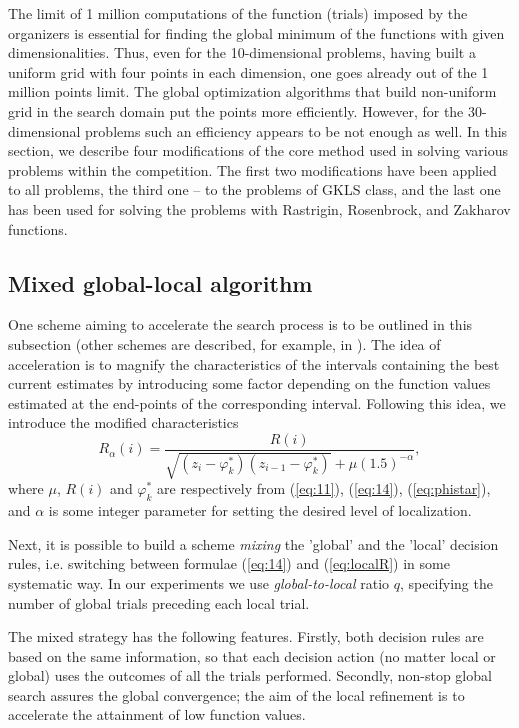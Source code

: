 \documentclass{llncs}
\begin{document}
The limit of 1 million computations of the function (trials) imposed by the organizers is essential for finding the global minimum of the functions with given dimensionalities. Thus, even for the 10-dimensional problems, having built a uniform grid with four points in each dimension, one goes already out of the 1 million points limit. %
The global optimization algorithms that build non-uniform grid in the search domain put the points more efficiently. %
However, for the 30-dimensional problems such an efficiency appears to be not enough as well. In this section, we describe four modifications of the core method used in solving various problems within the competition. The first two modifications have been applied to all problems, the third one – to the problems of GKLS class, and the last one has been used for solving the problems with Rastrigin, Rosenbrock, and Zakharov functions.

\subsection{Mixed global-local algorithm}\label{mixed}

One scheme aiming to accelerate the search process is to be outlined in this subsection (other schemes are described, for example, in \cite{Kvasov2006,Kvasov2015} ). The idea of acceleration is to magnify the characteristics of the intervals containing the best current estimates by introducing some factor depending on the function values estimated at the end-points of the corresponding interval. Following this idea, we introduce the modified characteristics 
\begin{equation}\label{eq:localR}
  R_\alpha(i) = \frac{R(i)}{\sqrt{(z_i-\varphi_k^\ast)(z_{i-1}-\varphi_k^\ast)}+\mu (1.5)^{-\alpha}},
\end{equation}
where $\mu$, $R(i)$ and $\varphi_k^\ast$ are respectively from (\ref{eq:11}), (\ref{eq:14}), (\ref{eq:phistar}), and $\alpha$ is some integer parameter for setting the desired level of localization. 

Next, it is possible to build a scheme \textit{mixing} the 'global' and the 'local' decision rules, i.e. switching between formulae (\ref{eq:14}) and (\ref{eq:localR}) in some systematic way. In our experiments we use \textit{global-to-local} ratio $q$, specifying the number of global trials preceding each local trial.

The mixed strategy has the following features. 	Firstly, both decision rules are based on the same information, so that each decision action (no matter local or global) uses the outcomes of all the trials performed. Secondly, non-stop global search assures the global convergence; the aim of the local refinement is to accelerate the attainment of low function values. 
\end{document}
